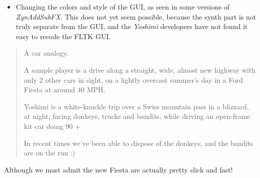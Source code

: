 \documentclass[
 11pt,
 twoside,
 a4paper,
 headinclude,
 footinclude,
 final                                 %
]{article}
\begin{document}
      \begin{itemize}
         \item Changing the colors and style of the GUI, as seen in some
            versions of \textsl{ZynAddSubFX}.  This does not yet seem possible,
            because the synth part is not truly separate from the GUI, and the
            \textsl{Yoshimi} developers have not found it easy to recode the
            FLTK GUI.
      \end{itemize}

   \begin{quotation}
      A car analogy.

      A sample player is a drive along a straight, wide, almost new highway
      with only 2 other cars in sight, on a lightly overcast summer's day in a
      Ford Fiesta at around 40 MPH.

      Yoshimi is a white-knuckle trip over a Swiss mountain pass in a blizzard,
      at night, facing donkeys, trucks and bandits, while driving an open-frame
      kit car doing 90 +

      In recent times we've been able to dispose of the donkeys, and the
      bandits are on the run :)
   \end{quotation}

   Although we must admit the new Fiesta are actually pretty slick and fast!




\printindex
\end{document}
